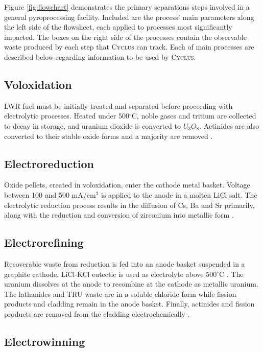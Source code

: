 \documentclass{anstrans}
\newcommand{\Cyclus}{\textsc{Cyclus}\xspace}%
\begin{document}
Figure \ref{fig:flowchart} demonstrates the primary separations steps involved 
in a general pyroprocessing facility. Included are the process' main parameters 
along the left side of the flowsheet, each applied to processes most 
significantly impacted. The boxes on the right side of the processes contain 
the observable waste produced by each step that \Cyclus can track. Each of main 
processes are described below regarding information to be used by \Cyclus.

\subsection{Voloxidation}

\gls{LWR} fuel must be initially treated and separated before proceeding with electrolytic processes. Heated under 
500$^{\circ}$C, noble gases and tritium are collected to decay in storage, and uranium dioxide is converted to $U_3O_8$. 
Actinides are also converted to their stable oxide forms and a majority are removed \cite{flowsheet_1998}. 

\subsection{Electroreduction}

Oxide pellets, created in voloxidation, enter the cathode metal basket. Voltage between 100 and 500 mA/cm$^2$ is applied 
to the anode in a molten LiCl salt. The electrolytic reduction process results in the diffusion of Cs, Ba and Sr primarily, 
along with the reduction and conversion of zirconium into metallic form \cite{choi_electrochemical_2015,flowsheet_1998}.

\subsection{Electrorefining}

Recoverable waste from reduction is fed into an anode basket suspended in a graphite cathode. LiCl-KCl eutectic is used as 
electrolyte above 500$^{\circ}$C \cite{flowsheet_1998,lee_korean_2011}. The uranium dissolves at the anode to recombine at 
the cathode as metallic uranium. The lathanides and \gls{TRU} waste are in a soluble chloride form  while fission 
products and cladding remain in the anode basket. Finally, actinides and fission products are removed from the cladding 
electrochemically \cite{lee_korean_2011}.

\subsection{Electrowinning}
\end{document}
